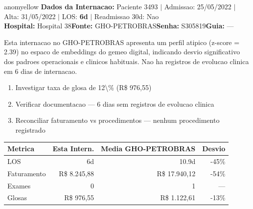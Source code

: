\documentclass[a4paper,10pt]{article}
\begin{document}
\begin{anomalycard}[Internacao 3050 | GHO-PETROBRAS | MODERADO (z=2.39)]{anomyellow}
\textbf{Dados da Internacao:} Paciente 3493 $\mid$ Admissao: 25/05/2022 $\mid$ Alta: 31/05/2022 $\mid$ LOS: \textbf{6d} $\mid$ Readmissao 30d: Nao\\
\textbf{Hospital:} Hospital 38\quad\textbf{Fonte:} GHO-PETROBRAS\quad\textbf{Senha:} S305819\quad\textbf{Guia:} ---\\
\vspace{2pt}\begin{tcolorbox}[colback=severityred!20,colframe=anomyellow,title={\textbf{Interpretacao de Negocio}},fonttitle=\bfseries\small,left=4pt,right=4pt,top=3pt,bottom=3pt]
{\small Esta internacao no GHO-PETROBRAS apresenta um perfil atipico (z-score = 2.39) no espaco de embeddings do gemeo digital, indicando desvio significativo dos padroes operacionais e clinicos habituais. Nao ha registros de evolucao clinica em 6 dias de internacao.}
\end{tcolorbox}
\begin{tcolorbox}[colback=severityyellow!30,colframe=anomorange,title={\textbf{Recomendacoes Especificas}},fonttitle=\bfseries\small,left=4pt,right=4pt,top=3pt,bottom=3pt]
\begin{enumerate}[nosep,leftmargin=16pt]
\item {\small Investigar taxa de glosa de 12\textbackslash{}\% (R\$ 976,55)}
\item {\small Verificar documentacao --- 6 dias sem registros de evolucao clinica}
\item {\small Reconciliar faturamento vs procedimentos --- nenhum procedimento registrado}
\end{enumerate}
\end{tcolorbox}
\begin{center}\begin{tabular}{l r r r}\toprule\textbf{Metrica} & \textbf{Esta Intern.} & \textbf{Media GHO-PETROBRAS} & \textbf{Desvio} \\\midrule
LOS & 6d & 10.9d & -45\% \\
Faturamento & R\$ 8.245,88 & R\$ 17.940,12 & -54\% \\
Exames & 0 & 1 & --- \\
Glosas & R\$ 976,55 & R\$ 1.122,61 & -13\% \\
\bottomrule\end{tabular}\end{center}


\end{anomalycard}
\end{document}
